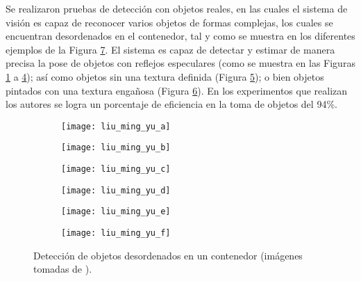Se realizaron pruebas de detección con objetos reales, en las cuales el sistema de visión es capaz de reconocer varios objetos de formas complejas, los cuales se encuentran desordenados en el contenedor, tal y como se muestra en los diferentes ejemplos de la Figura \ref{fig:doi:10.1177/0278364911436018}.
El sistema es capaz de detectar y estimar de manera precisa la pose de objetos con reflejos especulares (como se muestra en las Figuras \ref{subfig:bin_picking_a} a \ref{subfig:bin_picking_d}); así como objetos sin una textura definida (Figura \ref{subfig:bin_picking_e}); o bien objetos pintados con una textura engañosa (Figura \ref{subfig:bin_picking_f}).
En los experimentos que realizan los autores se logra un porcentaje de eficiencia en la toma de objetos del 94\!\%.
%
\begin{figure}[H]
	\def\hsep{4pt}%
	\begin{subfigure}{0.32\linewidth}
		\texttt{[image: liu\_ming\_yu\_a]}%
		\subcaption{}%
		\label{subfig:bin_picking_a}%
	\end{subfigure}%
	\hspace{\hsep}%
	\begin{subfigure}{0.32\linewidth}
		\texttt{[image: liu\_ming\_yu\_b]}%
		\subcaption{}%
		\label{subfig:bin_picking_b}%
	\end{subfigure}%
	\hspace{\hsep}%
	\begin{subfigure}{0.32\linewidth}
		\texttt{[image: liu\_ming\_yu\_c]}%
		\subcaption{}%
		\label{subfig:bin_picking_c}%
	\end{subfigure}%
	
	\vspace{3pt}	
	
	\begin{subfigure}{0.32\linewidth}
		\texttt{[image: liu\_ming\_yu\_d]}%
		\subcaption{}%
		\label{subfig:bin_picking_d}%
	\end{subfigure}%
	\hspace{\hsep}%
	\begin{subfigure}{0.32\linewidth}
		\texttt{[image: liu\_ming\_yu\_e]}%
		\subcaption{}%
		\label{subfig:bin_picking_e}%
	\end{subfigure}%
	\hspace{\hsep}%
	\begin{subfigure}{0.32\linewidth}
		\texttt{[image: liu\_ming\_yu\_f]}%
		\subcaption{}%
		\label{subfig:bin_picking_f}%
	\end{subfigure}%
	\caption{Detección de objetos desordenados en un contenedor (imágenes tomadas de \cite{doi:10.1177/0278364911436018}).}%
	\label{fig:doi:10.1177/0278364911436018}%
\end{figure}%
